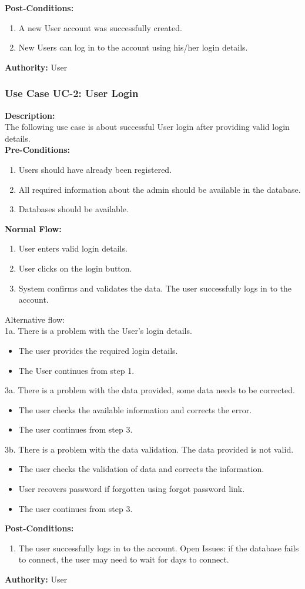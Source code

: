 \textbf{Post-Conditions: }
\begin{enumerate}
\item	A new User account was successfully created.
\item	New Users can log in to the account using his/her login details.
\end{enumerate}
\textbf{Authority:}
User
\subsubsection{Use Case UC-2: User Login}
\textbf{Description:}\\
The following use case is about successful User login after providing valid login details. 
\\
\textbf{Pre-Conditions:}
\begin{enumerate}
    \item Users should have already been registered.
    \item  All required information about the admin should be available in the database.
    \item Databases should be available.
\end{enumerate}
\textbf{Normal Flow:}\\
\begin{enumerate}
\item User enters valid login details. 
\item User clicks on the login button. 
\item System confirms and validates the data. The user successfully logs in to the account.
\end{enumerate}
Alternative flow: \\
1a. There is a problem with the User’s login details.
\begin{itemize}
    \item The user provides the required login details. 
    \item 	The User continues from step 1.
\end{itemize}
3a. There is a problem with the data provided, some data needs to be corrected.
\begin{itemize}
    \item The user checks the available information and corrects the error. 
    \item 	The user continues from step 3. 
\end{itemize}
3b. There is a problem with the data validation. The data provided is not valid. 
\begin{itemize}
    \item The user checks the validation of data and corrects the information. 
    \item User recovers password if forgotten using forgot password link. 
    \item The user continues from step 3.
\end{itemize}
\textbf{Post-Conditions: }
\begin{enumerate}
\item	The user successfully logs in to the account. 
Open Issues: if the database fails to connect, the user may need to wait for days to connect.
\end{enumerate}
\textbf{Authority:}
User
